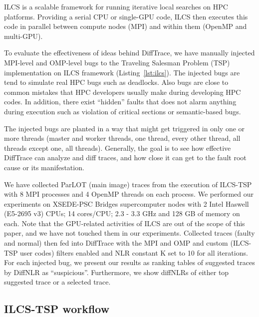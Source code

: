 ILCS is a scalable framework for running iterative local searches on HPC platforms.
%
Providing a serial CPU or single-GPU code, ILCS then executes this code in parallel between compute nodes (MPI) and within them (OpenMP and multi-GPU).
%

To evaluate the effectiveness of ideas behind DiffTrace, we have manually injected MPI-level and OMP-level bugs to the Traveling Salesman Problem (TSP) implementation on ILCS framework (Listing~\ref{lst:ilcs}).
%
The injected bugs are tend to simulate real HPC bugs such as deadlocks.
%
Also bugs are close to common mistakes that HPC developers usually make during developing HPC codes.
%
In addition, there exist ``hidden'' faults that does not alarm anything during execution such as violation of critical sections or semantic-based bugs. 
%



The injected bugs are planted in a way that might get triggered in only one or more threads (master and worker threads, one thread, every other thread, all threads except one, all threads). 
%
Generally, the goal is to see how effective DiffTrace can analyze and diff traces, and how close it can get to the fault root cause or its manifestation. 

%
We have collected ParLOT (main image) traces from the execution of ILCS-TSP with 8 MPI processes and 4 OpenMP threads on each process. We performed our experiments on XSEDE-PSC Bridges supercomputer nodes with 2 Intel Haswell (E5-2695 v3) CPUs; 14 cores/CPU; 2.3 - 3.3 GHz and 128 GB of memory on each.
%
Note that the GPU-related activities of ILCS are out of the scope of this paper, and we have not touched them in our experiments.
%
Collected traces (faulty and normal) then fed into DiffTrace with the MPI and OMP and custom (ILCS-TSP user codes) filters enabled and NLR constant K set to 10 for all iterations.
%
For each injected bug, we present our results as ranking tables of suggested traces by DiffNLR as ``suspicious''. Furthermore, we show diffNLRs of either top suggested trace or a selected trace.

\subsection{ILCS-TSP workflow}

